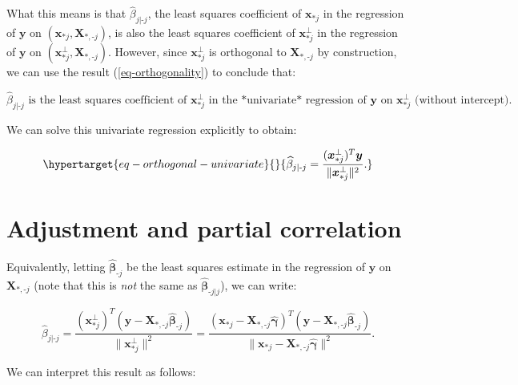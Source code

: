 \documentclass[
  11pt,
  letterpaper,
  oneside]{book}
\theoremstyle{definition}
\theoremstyle{plain}
\theoremstyle{plain}
\theoremstyle{plain}
\theoremstyle{remark}
\begin{document}
What this means is that \(\widehat{\beta}_{j|\text{-}j}\), the least
squares coefficient of \(\boldsymbol{x}_{*j}\) in the regression of
\(\boldsymbol{y}\) on
\((\boldsymbol{x}_{*j}, \boldsymbol{X}_{*,\text{-}j})\), is also the
least squares coefficient of \(\boldsymbol{x}^{\perp}_{*j}\) in the
regression of \(\boldsymbol{y}\) on
\((\boldsymbol{x}^{\perp}_{*j}, \boldsymbol{X}_{*,\text{-}j})\).
However, since \(\boldsymbol{x}^{\perp}_{*j}\) is orthogonal to
\(\boldsymbol{X}_{*,\text{-}j}\) by construction, we can use the result
(\ref{eq-orthogonality}) to conclude that:

\[
\widehat{\beta}_{j|\text{-}j} \text{ is the least squares coefficient of } \boldsymbol{x}^{\perp}_{*j} \text{ in the *univariate* regression of } \boldsymbol{y} \text{ on } \boldsymbol{x}^{\perp}_{*j} \text{ (without intercept).}
\]

We can solve this univariate regression explicitly to obtain:

\begin{equation}\protect\hypertarget{eq-orthogonal-univariate}{}{
\widehat{\beta}_{j|\text{-}j} = \frac{(\boldsymbol{x}^{\perp}_{*j})^T \boldsymbol{y}}{\|\boldsymbol{x}^{\perp}_{*j}\|^2}.
}\label{eq-orthogonal-univariate}\end{equation}

\hypertarget{adjustment-and-partial-correlation}{%
\section{Adjustment and partial
correlation}\label{adjustment-and-partial-correlation}}

Equivalently, letting \(\boldsymbol{\widehat{\beta}}_{\text{-}j}\) be
the least squares estimate in the regression of \(\boldsymbol{y}\) on
\(\boldsymbol{X}_{*,\text{-}j}\) (note that this is \emph{not} the same
as \(\boldsymbol{\widehat{\beta}}_{\text{-}j|j}\)), we can write:

\[
\widehat{\beta}_{j|\text{-}j} = \frac{(\boldsymbol{x}^{\perp}_{*j})^T(\boldsymbol{y} - \boldsymbol{X}_{*,\text{-}j}\boldsymbol{\widehat{\beta}}_{\text{-}j})}{\|\boldsymbol{x}^{\perp}_{*j}\|^2} = \frac{(\boldsymbol{x}_{*j} - \boldsymbol{X}_{*,\text{-}j}\boldsymbol{\widehat{\gamma}})^T(\boldsymbol{y} - \boldsymbol{X}_{*,\text{-}j}\boldsymbol{\widehat{\beta}}_{\text{-}j})}{\|\boldsymbol{x}_{*j} -\boldsymbol{X}_{*,\text{-}j}\boldsymbol{\widehat{\gamma}}\|^2}.
\]

We can interpret this result as follows:
\end{document}
